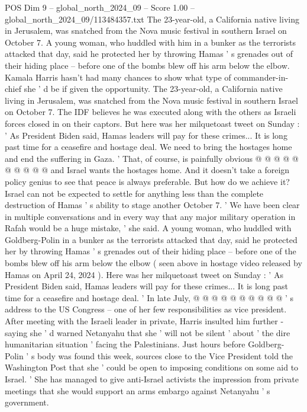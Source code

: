 \begin{textsample}{POS Dim 9 – global\_north\_2024\_09 – Score 1.00 – global\_north\_2024\_09/113484357.txt}  \label{ex:f9_pos_243}
The 23-year-old, a California native living in Jerusalem, was snatched from the Nova music festival in southern Israel on October 7.
A young woman, who huddled with him in a bunker as the terrorists attacked that day, said he protected her by throwing Hamas ' s grenades out of their hiding place -- before one of the bombs blew off his arm below the elbow.
Kamala Harris hasn't had many chances to show what type of commander-in-chief she ' d be if given the opportunity.
The 23-year-old, a California native living in Jerusalem, was snatched from the Nova music festival in southern Israel on October 7.
The IDF believes he was executed along with the others as Israeli forces closed in on their captors.
But here was her milquetoast tweet on Sunday : ' As President Biden said, Hamas leaders will pay for these crimes...
It is long past time for a ceasefire and hostage deal.
We need to bring the hostages home and end the suffering in Gaza. ' That, of course, is painfully obvious @ @ @ @ @ @ @ @ @ @ and Israel wants the hostages home.
And it doesn't take a foreign policy genius to see that peace is always preferable.
But how do we achieve it?
Israel can not be expected to settle for anything less than the complete destruction of Hamas ' s ability to stage another October 7. ' We have been clear in multiple conversations and in every way that any major military operation in Rafah would be a huge mistake, ' she said.
A young woman, who huddled with Goldberg-Polin in a bunker as the terrorists attacked that day, said he protected her by throwing Hamas ' s grenades out of their hiding place -- before one of the bombs blew off his arm below the elbow ( seen above in hostage video released by Hamas on April 24, 2024 ).
Here was her milquetoast tweet on Sunday : ' As President Biden said, Hamas leaders will pay for these crimes...
It is long past time for a ceasefire and hostage deal. ' In late July, @ @ @ @ @ @ @ @ @ @ ' s address to the US Congress -- one of her few responsibilities as vice president.
After meeting with the Israeli leader in private, Harris insulted him further - saying she ' d warned Netanyahu that she ' will not be silent ' about ' the dire humanitarian situation ' facing the Palestinians.
Just hours before Goldberg-Polin ' s body was found this week, sources close to the Vice President told the Washington Post that she ' could be open to imposing conditions on some aid to Israel. ' She has managed to give anti-Israel activists the impression from private meetings that she would support an arms embargo against Netanyahu ' s government.

\end{textsample}
